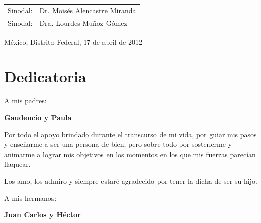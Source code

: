 \documentclass[12pt,a4paper,spanish,openany]{book}
\begin{document}
\begin{titlepage}
\begin{center}
\begin{table}[h]
\begin{center}
\begin{tabular}{l l}
Sinodal: & Dr. Moisés Alencastre Miranda \\

Sinodal: & Dra. Lourdes Muñoz Gómez \\


\end{tabular}
\end{center}
\end{table}

\vspace{22 mm}

{\large México, Distrito Federal, 17 de abril de 2012}

\end{center}

\end{titlepage}

\newpage

\thispagestyle{empty}
\section*{Dedicatoria}
\vspace{35 mm}

\begin{large}
\noindent 
A mis padres:
\end{large}

\vspace{10 mm}
\begin{Large}
\noindent 
\textbf{Gaudencio y Paula}
\end{Large}

\vspace{10 mm}
\noindent 
Por todo el apoyo brindado durante el transcurso de mi vida, por guiar mis pasos
y enseñarme a ser una persona de bien, pero sobre todo por sostenerme y animarme
a lograr mis objetivos en los momentos en los que mis fuerzas parecían
flaquear.

\noindent 
Los amo, los admiro y siempre estaré agradecido por tener la dicha de ser su
hijo.

\vspace{25 mm}
\begin{large}
\noindent 
A mis hermanos:
\end{large}

\vspace{10 mm}
\begin{Large}
\noindent 
\textbf{Juan Carlos y Héctor}
\end{Large}
\vspace{10 mm}
\end{document}
